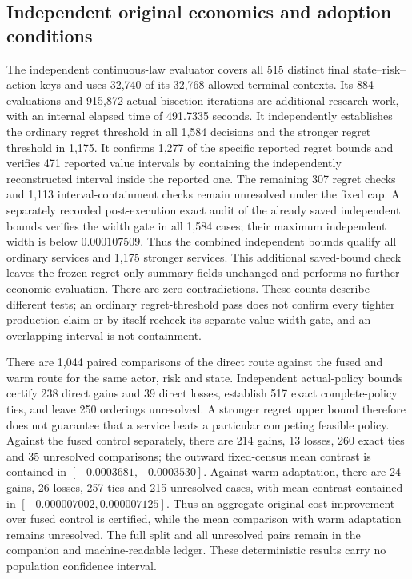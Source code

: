 \subsection{Independent original economics and adoption conditions}

The independent continuous-law evaluator covers all 515 distinct final
state--risk--action keys and uses 32,740 of its 32,768 allowed terminal
contexts. Its 884 evaluations and 915,872 actual bisection iterations are
additional research work, with an internal elapsed time of 491.7335 seconds.
It independently establishes the ordinary regret threshold in all 1,584
decisions and the stronger regret threshold in 1,175. It confirms 1,277 of the specific reported regret
bounds and verifies 471 reported value intervals by containing the independently
reconstructed interval inside the reported one. The remaining 307 regret
checks and 1,113 interval-containment checks remain unresolved under the fixed
cap. A separately recorded post-execution exact audit of the already saved
independent bounds verifies the width gate in all 1,584 cases; their maximum
independent width is below $0.000107509$. Thus the combined independent bounds
qualify all ordinary services and 1,175 stronger services. This additional
saved-bound check leaves the frozen regret-only summary fields unchanged and
performs no further economic evaluation. There are zero contradictions. These counts describe different tests;
an ordinary regret-threshold pass does not confirm every tighter production
claim or by itself recheck its separate value-width gate,
and an overlapping interval is not containment.

There are 1,044 paired comparisons of the direct route against the fused and
warm route for the same actor, risk and state. Independent actual-policy bounds
certify 238 direct gains and 39 direct losses, establish 517 exact complete-policy
ties, and leave 250 orderings unresolved. A stronger regret upper bound therefore
does not guarantee that a service beats a particular competing feasible policy.
Against the fused control separately, there are 214 gains, 13 losses, 260
exact ties and 35 unresolved comparisons; the outward fixed-census mean
contrast is contained in $[-0.0003681,-0.0003530]$. Against warm adaptation,
there are 24 gains, 26 losses, 257 ties and 215 unresolved cases, with mean
contrast contained in $[-0.000007002,0.000007125]$. Thus an aggregate original
cost improvement over fused control is certified, while the mean comparison
with warm adaptation remains unresolved. The full split and all unresolved
pairs remain in the companion and machine-readable ledger. These deterministic results carry no
population confidence interval.

